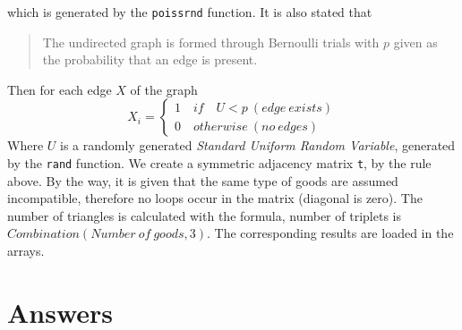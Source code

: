 \documentclass[12pt]{article}
\begin{document}
which is generated by the \texttt{poissrnd} function.
It is also stated that
\begin{quotation}
   The undirected graph is formed through Bernoulli trials with $p$ given 
   as the probability that an edge is present.
\end{quotation}
Then for each edge $X$ of the graph 
$$
X_i=\begin{cases}
             1\quad if\quad U<p \ (edge \ exists)\\
             0\quad otherwise \ (no \ edges)
          \end{cases}
$$
Where $U$ is a randomly generated \textit{Standard Uniform Random Variable}, generated by
the \texttt{rand} function. We create a symmetric adjacency matrix \texttt{t}, by the rule above.
By the way, it is given that the same type of goods are assumed incompatible, therefore 
no loops occur in the matrix (diagonal is zero). The number of triangles is calculated
with the formula, number of triplets is $Combination(Number\ of\ goods,3)$. The corresponding 
results are loaded in the arrays.
\section*{Answers}
\end{document}
